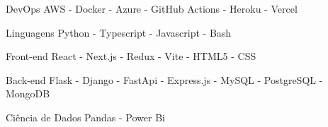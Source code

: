 

\begin{cvskills}

  \cvskill
    {DevOps} %
    {AWS - Docker - Azure - GitHub Actions - Heroku - Vercel} %

  \cvskill
    {Linguagens} %
    {Python - Typescript - Javascript - Bash} %

  \cvskill
      {Front-end} %
      {React - Next.js - Redux - Vite - HTML5 - CSS} %

  \cvskill
    {Back-end} %
    {Flask - Django - FastApi - Express.js -  MySQL - PostgreSQL - MongoDB} %

  \cvskill
    {Ciência de Dados} %
    {Pandas - Power Bi} %

\end{cvskills}
